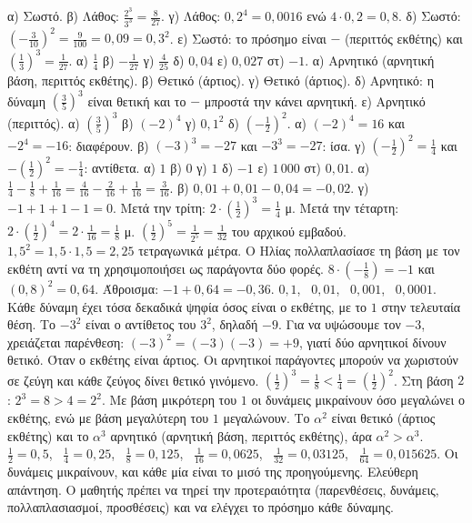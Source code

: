 α) Σωστό. β) Λάθος: $\frac{2^3}{3^3}=\frac{8}{27}$. γ) Λάθος: $0{,}2^4=0{,}0016$ ενώ $4\cdot0{,}2=0{,}8$. δ) Σωστό: $\left(-\frac{3}{10}\right)^2=\frac{9}{100}=0{,}09=0{,}3^2$. ε) Σωστό: το πρόσημο είναι $-$ (περιττός εκθέτης) και $\left(\frac{1}{3}\right)^3=\frac{1}{27}$.
 α) $\frac{1}{4}$ \quad β) $-\frac{1}{27}$ \quad γ) $\frac{4}{25}$ \quad δ) $0{,}04$ \quad ε) $0{,}027$ \quad στ) $-1$.
 α) Αρνητικό (αρνητική βάση, περιττός εκθέτης). β) Θετικό (άρτιος). γ) Θετικό (άρτιος). δ) Αρνητικό: η δύναμη $\left(\frac{3}{5}\right)^3$ είναι θετική και το $-$ μπροστά την κάνει αρνητική. ε) Αρνητικό (περιττός).
 α) $\left(\frac{3}{5}\right)^3$ \quad β) $(-2)^4$ \quad γ) $0{,}1^2$ \quad δ) $\left(-\frac{1}{2}\right)^2$.
 α) $(-2)^4=16$ και $-2^4=-16$: διαφέρουν. β) $(-3)^3=-27$ και $-3^3=-27$: ίσα. γ) $\left(-\frac{1}{2}\right)^2=\frac{1}{4}$ και $-\left(\frac{1}{2}\right)^2=-\frac{1}{4}$: αντίθετα.
 α) $1$ \quad β) $0$ \quad γ) $1$ \quad δ) $-1$ \quad ε) $1\,000$ \quad στ) $0{,}01$.
 α) $\frac{1}{4}-\frac{1}{8}+\frac{1}{16}=\frac{4}{16}-\frac{2}{16}+\frac{1}{16}=\frac{3}{16}$. β) $0{,}01+0{,}01-0{,}04=-0{,}02$. γ) $-1+1+1-1=0$.
 Μετά την τρίτη: $2\cdot\left(\frac{1}{2}\right)^3=\frac{1}{4}$ μ. Μετά την τέταρτη: $2\cdot\left(\frac{1}{2}\right)^4=2\cdot\frac{1}{16}=\frac{1}{8}$ μ.
 $\left(\frac{1}{2}\right)^5=\frac{1}{2^5}=\frac{1}{32}$ του αρχικού εμβαδού.
 $1{,}5^2=1{,}5\cdot1{,}5=2{,}25$ τετραγωνικά μέτρα. Ο Ηλίας πολλαπλασίασε τη βάση με τον εκθέτη αντί να τη χρησιμοποιήσει ως παράγοντα δύο φορές.
 $8\cdot\left(-\frac{1}{8}\right)=-1$ και $(0{,}8)^2=0{,}64$. Άθροισμα: $-1+0{,}64=-0{,}36$.
 $0{,}1$, \ $0{,}01$, \ $0{,}001$, \ $0{,}0001$. Κάθε δύναμη έχει τόσα δεκαδικά ψηφία όσος είναι ο εκθέτης, με το $1$ στην τελευταία θέση.
 Το $-3^2$ είναι ο αντίθετος του $3^2$, δηλαδή $-9$. Για να υψώσουμε τον $-3$, χρειάζεται παρένθεση: $(-3)^2=(-3)(-3)=+9$, γιατί δύο αρνητικοί δίνουν θετικό.
 Όταν ο εκθέτης είναι άρτιος. Οι αρνητικοί παράγοντες μπορούν να χωριστούν σε ζεύγη και κάθε ζεύγος δίνει θετικό γινόμενο.
 $\left(\frac{1}{2}\right)^3=\frac{1}{8}<\frac{1}{4}=\left(\frac{1}{2}\right)^2$. Στη βάση $2$: $2^3=8>4=2^2$. Με βάση μικρότερη του $1$ οι δυνάμεις μικραίνουν όσο μεγαλώνει ο εκθέτης, ενώ με βάση μεγαλύτερη του $1$ μεγαλώνουν.
 Το $\alpha^2$ είναι θετικό (άρτιος εκθέτης) και το $\alpha^3$ αρνητικό (αρνητική βάση, περιττός εκθέτης), άρα $\alpha^2>\alpha^3$.
 $\frac{1}{2}=0{,}5$, \ $\frac{1}{4}=0{,}25$, \ $\frac{1}{8}=0{,}125$, \ $\frac{1}{16}=0{,}0625$, \ $\frac{1}{32}=0{,}03125$, \ $\frac{1}{64}=0{,}015625$. Οι δυνάμεις μικραίνουν, και κάθε μία είναι το μισό της προηγούμενης.
 Ελεύθερη απάντηση. Ο μαθητής πρέπει να τηρεί την προτεραιότητα (παρενθέσεις, δυνάμεις, πολλαπλασιασμοί, προσθέσεις) και να ελέγχει το πρόσημο κάθε δύναμης.
